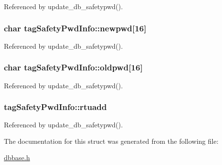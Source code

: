 Referenced by update\-\_\-db\-\_\-safetypwd().

\hypertarget{structtagSafetyPwdInfo_a0867e7e3865114da0143f853444255e9}{
\subsubsection[{newpwd}]{\setlength{\rightskip}{0pt plus 5cm}char tag\-Safety\-Pwd\-Info\-::newpwd\mbox{[}16\mbox{]}}}\label{structtagSafetyPwdInfo_a0867e7e3865114da0143f853444255e9}


Referenced by update\-\_\-db\-\_\-safetypwd().

\hypertarget{structtagSafetyPwdInfo_aac781c8cd1814eb92a0403b0308db79c}{
\subsubsection[{oldpwd}]{\setlength{\rightskip}{0pt plus 5cm}char tag\-Safety\-Pwd\-Info\-::oldpwd\mbox{[}16\mbox{]}}}\label{structtagSafetyPwdInfo_aac781c8cd1814eb92a0403b0308db79c}


Referenced by update\-\_\-db\-\_\-safetypwd().

\hypertarget{structtagSafetyPwdInfo_a66f0ab9e1b85179ba191e8e4e9dd7995}{
\subsubsection[{rtuadd}]{ tag\-Safety\-Pwd\-Info\-::rtuadd}}\label{structtagSafetyPwdInfo_a66f0ab9e1b85179ba191e8e4e9dd7995}


Referenced by update\-\_\-db\-\_\-safetypwd().



The documentation for this struct was generated from the following file\-:\begin{DoxyCompactItemize}
\item 
\hyperlink{dbbase_8h}{dbbase.\-h}\end{DoxyCompactItemize}

